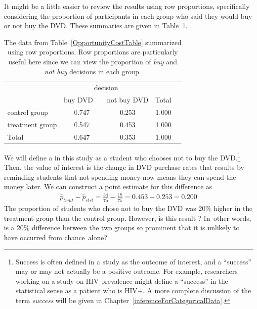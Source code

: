 It might be a little easier to review the results using row proportions, specifically considering the proportion of participants in each group who said they would buy or not buy the DVD. These summaries are given in Table~\ref{OpportunityCostTableRowProp}.

\begin{table}[ht]
\centering
\begin{tabular}{l cc rr}
& \multicolumn{2}{c}{decision} \\
\cline{2-3}
				& {buy DVD}\ \  	& {not buy DVD} & Total & \hspace{3mm}  \\ 
\cline{1-4}
control group 		& 0.747	& 0.253	& 1.000 \\ 
treatment group 	& 0.547	& 0.453	& 1.000 \\ 
\cline{1-4}
Total				& 0.647	& 0.353	& 1.000
\end{tabular}
\caption{The data from Table~\ref{OpportunityCostTable} summarized using row proportions. Row proportions are particularly useful here since we can view the proportion of \emph{buy} and \emph{not buy} decisions in each group.}
\label{OpportunityCostTableRowProp}
\end{table}

We will define a  in this study as a student who chooses not to buy the DVD.\footnote{Success is often defined in a study as the outcome of interest, and a ``success'' may or may not actually be a positive outcome. For example, researchers working on a study on HIV prevalence might define a ``success'' in the statistical sense as a patient who is HIV+. A more complete discussion of the term \emph{success} will be given in Chapter~\ref{inferenceForCategoricalData}. } Then, the value of interest is the change in DVD purchase rates that results by reminding students that not spending money now means they can spend the money later.
We can construct a point estimate for this difference as
\begin{align*}
\hat{p}_{trmt} - \hat{p}_{ctrl}
  = \frac{34}{75} - \frac{19}{75}
  = 0.453 - 0.253
  = 0.200
\end{align*}
The proportion of students who chose not to buy the DVD was 20\% higher in the treatment group than the control group.
However, is this result ? In~other words, is a 20\% difference between the two groups so prominent that it is unlikely to have occurred from chance~alone?

